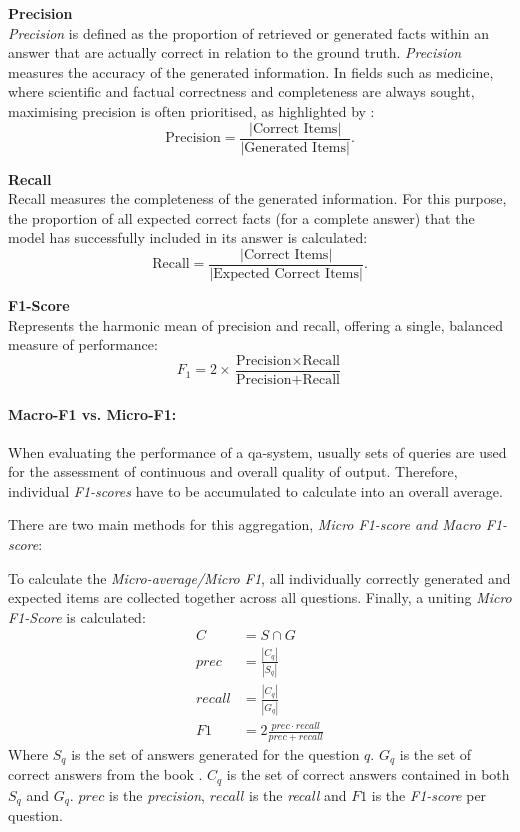 %
\noindent\textbf{Precision}\\
\label{def:precision_approach}
    \textit{Precision} is defined as the proportion of retrieved or generated facts within an answer that are actually correct in relation to the ground truth.
    \textit{Precision} measures the accuracy of the generated information.
    In fields such as medicine, where scientific and factual correctness and completeness are always sought, maximising precision is often prioritised, as highlighted by \citet{Paul_Keller}:
		\[
        \text{Precision} = \frac{|\text{Correct Items}|}{|\text{Generated Items}|}.
        \]
    
 \noindent\textbf{Recall}\\
 \label{def:recall_approach}
    Recall measures the completeness of the generated information.
    For this purpose, the proportion of all expected correct facts (for a complete answer) that the model has successfully included in its answer is calculated:
    \[
    \text{Recall} = \frac{|\text{Correct Items}|}{|\text{Expected Correct Items}|}.
    \]%
    
\noindent\textbf{F1-Score}\label{def:F1-score_approach}\\
    Represents the harmonic mean of precision and recall, offering a single, balanced measure of performance:\\
    \[
    F_1 = 2 \times \frac{\text{Precision} \times \text{Recall}}{\text{Precision} + \text{Recall}}
    \]
\paragraph{Macro-F1 vs. Micro-F1:}
%
When evaluating the performance of a \ac{qa}-system, usually sets of queries are used for the assessment of continuous and overall quality of output.
Therefore, individual \textit{F1-scores} have to be accumulated to calculate into an overall average.

There are two main methods for this aggregation, \textit{Micro F1-score and Macro F1-score}:

To calculate the \textit{Micro-average/Micro F1}, all individually correctly generated and expected items are collected together across all questions. 
Finally, a uniting \textit{Micro F1-Score} is calculated:
\begin{align}
    C      & = S \cap G                                 \\
    prec   & = \frac{|C_{q}|}{|S_{q}|}                  \\
    recall & = \frac{|C_{q}|}{|G_{q}|}                  \\
    F1     & = 2\frac{prec \cdot recall}{prec + recall}
\end{align}
%
Where $S_q$ is the set of answers generated for the question $q$.\newline 
$G_q$ is the set of correct answers from the book \citet{bb}.\newline
$C_q$ is the set of correct answers contained in both $S_q$ and $G_q$.
$prec$ is the \textit{precision}, $recall$ is the \textit{recall} and $F1$ is the \textit{F1-score} per question.
%

